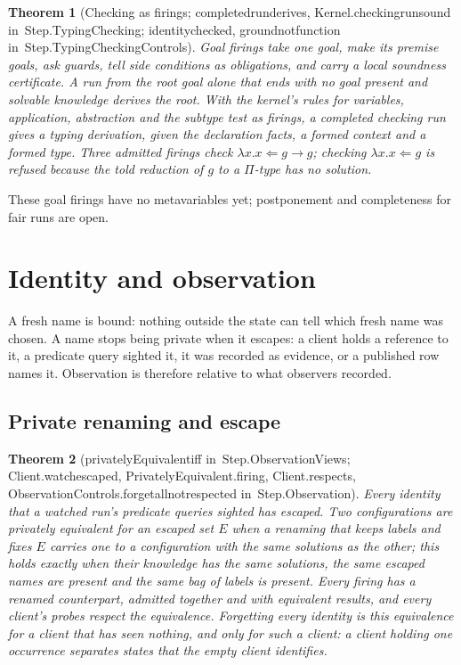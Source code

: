 \documentclass[11pt]{article}
\newtheorem{theorem}{Theorem}
\theoremstyle{remark}
\newcommand{\lean}[1]{{\ttfamily\def\_{\textunderscore\allowbreak}#1}}
\newcommand{\inmod}[1]{in~{\ttfamily\def\_{\textunderscore\allowbreak}#1}}
\begin{document}
\begin{theorem}[Checking as firings; \lean{completed\_run\_derives}, \lean{Kernel.checking\_run\_sound} \inmod{Step.TypingChecking}; \lean{identity\_checked}, \lean{ground\_not\_function} \inmod{Step.TypingCheckingControls}]
Goal firings take one goal, make its premise goals, ask guards, tell side conditions as obligations,
and carry a local soundness certificate. A run from the root goal alone that ends with no goal present
and solvable knowledge derives the root. With the kernel's rules for variables, application,
abstraction and the subtype test as firings, a completed checking run gives a typing derivation, given
the declaration facts, a formed context and a formed type. Three admitted firings check $\lambda x.x
\Leftarrow g\to g$; checking $\lambda x.x\Leftarrow g$ is refused because the told reduction of $g$ to a
$\Pi$-type has no solution.
\end{theorem}
These goal firings have no metavariables yet; postponement and completeness for fair runs are open.

\section{Identity and observation}\label{sec:observation}

A fresh name is bound: nothing outside the state can tell which fresh name was chosen. A name stops
being private when it escapes: a client holds a reference to it, a predicate query sighted it, it was
recorded as evidence, or a published row names it. Observation is therefore relative to what observers
recorded.

\subsection{Private renaming and escape}

\begin{theorem}[\lean{privatelyEquivalent\_iff} \inmod{Step.ObservationViews}; \lean{Client.watch\_escaped}, \lean{PrivatelyEquivalent.firing}, \lean{Client.respects}, \lean{ObservationControls.forget\_all\_not\_respected} \inmod{Step.Observation}]
Every identity that a watched run's predicate queries sighted has escaped. Two configurations are
privately equivalent for an escaped set $E$ when a renaming that keeps labels and fixes $E$ carries one to
a configuration with the same solutions as the other; this holds exactly when their knowledge has the
same solutions, the same escaped names are present and the same bag of labels is present. Every
firing has a renamed counterpart, admitted together and with equivalent results, and every client's
probes respect the equivalence. Forgetting every identity is this equivalence for a client that has
seen nothing, and only for such a client: a client holding one occurrence separates states that the
empty client identifies.
\end{theorem}
\end{document}
